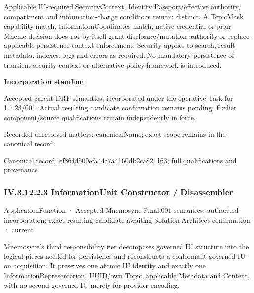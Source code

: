 Applicable IU-required SecurityContext, Identity Passport/effective authority, compartment and information-change conditions remain distinct. A TopicMask capability match, InformationCoordinates match, native credential or prior Mneme decision does not by itself grant disclosure/mutation authority or replace applicable persistence-context enforcement. Security applies to search, result metadata, indexes, logs and errors as required. No mandatory persistence of transient security context or alternative policy framework is introduced.



\par\medskip\textbf{Incorporation standing}\par


Accepted parent DRP semantics, incorporated under the operative Task for 1.1.23/001. Actual resulting candidate confirmation remains pending. Earlier component/source qualifications remain independently in force.


{\small Recorded unresolved matters: canonicalName; exact scope remains in the canonical record.}\par
{\footnotesize \href{../../../../../../../continuum/application/application-function/ef864d509efa44a7a4160db2ca821163.md}{Canonical record: ef864d509efa44a7a4160db2ca821163}; full qualifications and provenance.}\par
\subsubsection*{IV.3.12.2.3 InformationUnit Constructor / Disassembler}
\label{navigation:IV.3.12.2.3}

\label{element:75349ac7a0d44dec955b77bb5ecf1151}
{\small ApplicationFunction · Accepted Mnemosyne Final.001 semantics; authorised incorporation; exact resulting candidate awaiting Solution Architect confirmation · current}\par

Mnemosyne's third responsibility tier decomposes governed IU structure into the logical pieces needed for persistence and reconstructs a conformant governed IU on acquisition. It preserves one atomic IU identity and exactly one InformationRepresentation, UUID/own Topic, applicable Metadata and Content, with no second governed IU merely for provider encoding.



